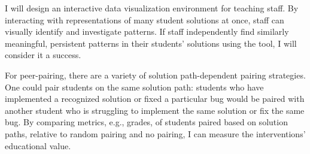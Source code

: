 \documentclass[12pt]{article}
\begin{document}

I will design an interactive data visualization environment for teaching staff. By interacting with representations of many student solutions at once, staff can visually identify and investigate patterns. If staff independently find similarly meaningful, persistent patterns in their students' solutions using the tool, I will consider it a success.

For peer-pairing, there are a variety of solution path-dependent pairing strategies. One could pair students on the same solution path: students who have implemented a recognized solution or fixed a particular bug would be paired with another student who is struggling to implement the same solution or fix the same bug. By comparing metrics, e.g., grades, of students paired based on solution paths, relative to random pairing and no pairing, I can measure the interventions' educational value.


\end{document}
